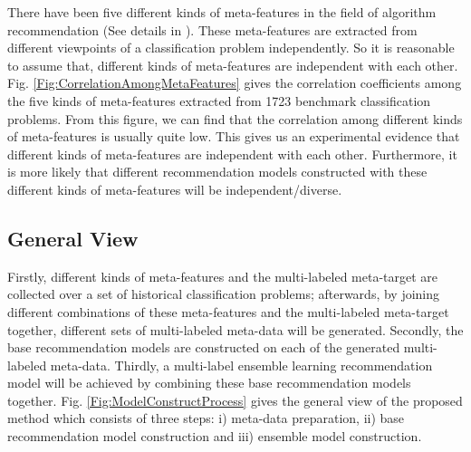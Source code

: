 \documentclass[prodmode,acmtkdd]{acmsmall}
\begin{document}
\begin{enumerate}
    There have been five different kinds of meta-features in the
    field of algorithm recommendation (See details in \cite{wang2014generic}). These meta-features are extracted
    from different viewpoints of a classification problem independently. So it is
    reasonable to assume that, different kinds of meta-features are independent
    with each other. Fig. \ref{Fig:CorrelationAmongMetaFeatures} gives the correlation
    coefficients among the five kinds of meta-features extracted from
    1723 benchmark classification problems. From this figure, we can
    find that the correlation among different kinds of meta-features is
    usually quite low. This gives us an experimental evidence that different kinds of
    meta-features are independent with each other.
    Furthermore, it is more likely that different recommendation models constructed with
    these different kinds of meta-features will be independent/diverse.
\end{enumerate}

\subsection{General View}\label{subsec:genView}

Firstly, different kinds of meta-features and the multi-labeled
meta-target are collected over a set of historical classification
problems; afterwards, by joining different combinations of these
meta-features and the multi-labeled meta-target together, different
sets of multi-labeled meta-data will be generated. Secondly, the
base recommendation models are constructed on each of the generated
multi-labeled meta-data. Thirdly, a multi-label ensemble learning
recommendation model will be achieved by combining these base
recommendation models together. Fig. \ref{Fig:ModelConstructProcess}
gives the general view of the proposed method which consists of
three steps: i) meta-data preparation, ii) base recommendation model
construction and iii) ensemble model construction.
\end{document}
